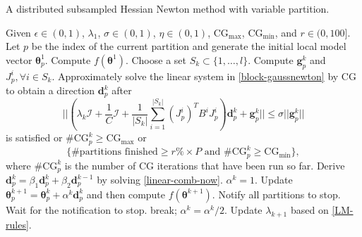 \documentclass[12pt]{article}
\def\bd{{\boldsymbol d}}
\def\bg{{\boldsymbol g}}
\def\btheta{\boldsymbol \theta}
\renewcommand{\baselinestretch}{2}
\begin{document}
\begin{algorithm}[t]
  \caption{A distributed subsampled Hessian Newton method with variable partition.}
  \begin{algorithmic}[1]
  \State Given $\epsilon \in (0,1)$, $\lambda_{1}$, $\sigma \in (0,1)$, $\eta \in (0,1)$, $\text{CG}_{\max}$, $\text{CG}_{\min}$, and $r \in (0,100]$.
  \State Let $p$ be the index of the current partition and generate the initial local model vector $\btheta^1_p$.
  \State Compute $f(\btheta^{1})$.
    \State Choose a set $S_k \subset \{1,\ldots,l\}$.
  	\State Compute $\bg_p^k$ and $J^i_p, \forall i \in S_k$.
	\State Approximately solve the linear system in \eqref{block-gaussnewton} by CG to obtain a direction $\bd_p^k$
	\Statex \hspace{3ex} after 
	\begin{equation*}
        || (\lambda_k \mathcal I + \frac{1}{C} \mathcal I + \frac{1}{|S_k|}\sum_{i=1}^{|S_k|}(J^i_p)^TB^iJ^i_p)\bd_p^k + \bg_p^k|| \leq \sigma ||\bg_p^k||
	\end{equation*}
  \Statex \indent \hspace{3ex} is satisfied or $\# \text{CG}_p^k \geq \text{CG}_{\max}$ or 
	\begin{equation*}
	 \text{\{\# partitions finished} \geq r\% \times P \text{ and }  \#\text{CG}^k_p \geq \text{CG}_{\min}\}, 
	\end{equation*}
	\Statex \indent \hspace{3ex} where $\#\text{CG}_p^k$ is the number of CG iterations that have been run so far.
	\State Derive $\bd^k_p = \beta_1\bd^{k}_p + \beta_2 \bd^{k-1}_p$ by solving \eqref{linear-comb-now}.
	\State $\alpha^k = 1$.
		\State Update $\btheta^{k+1}_p = \btheta^{k}_p + \alpha^k \bd^{k}_p$ and then compute $f(\btheta^{k+1})$.
				\State Notify all partitions to stop. 
			\EndIf
		\Else
			\State Wait for the notification to stop.
		\EndIf
			\State break;
		\EndIf
		\State $\alpha^k = \alpha^k/2$.
	\EndWhile
	\State Update $\lambda_{k+1}$ based on \eqref{LM-rules}.
  \EndFor
  \end{algorithmic}
  \label{alg:distri}
\end{algorithm}
\renewcommand{\baselinestretch}{2}
\end{document}
